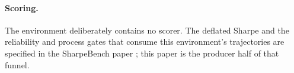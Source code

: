 \paragraph{Scoring.} The environment deliberately contains no scorer. The deflated Sharpe \citep{bailey2014deflated} and the reliability and process gates that consume this environment's trajectories are specified in the SharpeBench paper \citep{toca2026sharpebench}; this paper is the producer half of that funnel.
